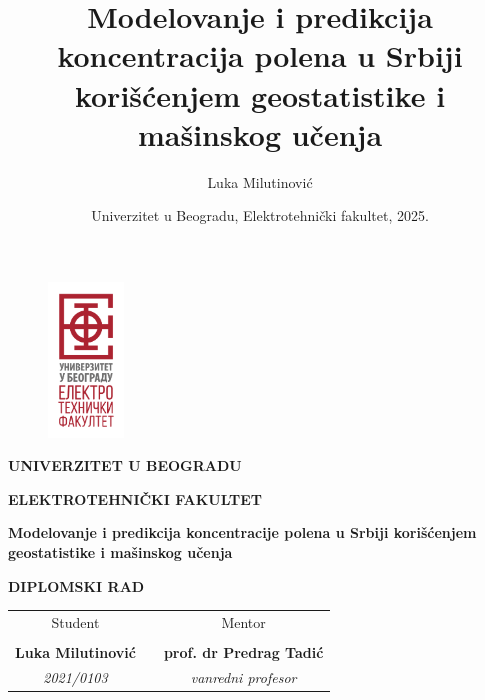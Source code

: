 \documentclass[12pt]{article}
\title{Modelovanje i predikcija koncentracija polena u Srbiji korišćenjem geostatistike i mašinskog učenja}
\author{Luka Milutinović}
\date{Univerzitet u Beogradu, Elektrotehnički fakultet, 2025.}
\begin{document}
\newpage

\begin{figure}[H]
    \centering
    \includegraphics[width=2cm]{grafici/etflogotip.png}

\end{figure}

\begin{center}
\large \textbf{UNIVERZITET U BEOGRADU}
\end{center}
\begin{center}
\large \textbf{ELEKTROTEHNIČKI FAKULTET}
\end{center}



\thispagestyle{empty}


\vspace*{3cm}
\begin{center}
\Huge \textbf{Modelovanje i predikcija koncentracije polena u Srbiji korišćenjem geostatistike i mašinskog učenja}
\end{center}


\begin{center}
\small \textbf{DIPLOMSKI RAD}
\end{center}


\vspace*{6cm}

\begin{center}

\begin{tabular}{ccc}
\large Student & \hspace*{3cm} & \large Mentor \\
 & & \\
\large\textbf{Luka Milutinović} & & \large\textbf{prof. dr Predrag Tadić } \\
\large\textsl{2021/0103} & & \large\textsl{vanredni profesor} \\

\end{tabular}
\end{center}

\vspace*{0.9cm}
\end{document}
